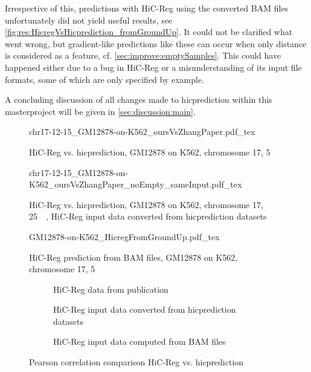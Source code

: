 Irrespective of this, predictions with HiC-Reg using the converted BAM files unfortunately did not yield useful results, see 
\autoref{fig:res:HicregVsHicprediction_fromGroundUp}.
It could not be clarified what went wrong, 
but gradient-like predictions like these can occur when only distance is
considered as a feature, cf. \autoref{sec:improve:emptySamples}.
This could have happened either due to a bug in HiC-Reg 
or a misunderstanding of its input file formats, some of which are 
only specified by example.

A concluding discussion of all changes made to hicprediction within this masterproject
will be given in \autoref{sec:discussion:main}.
\begin{figure}[hbp]
\centering
\scriptsize
{chr17-12-15_GM12878-on-K562_oursVsZhangPaper.pdf_tex}
\caption{HiC-Reg vs. hicprediction, GM12878 on K562, chromosome 17, \SI{5}{\kilo\bp}}
\label{fig:res:HicregVsHicprediction_supplementary}
\end{figure}
\begin{figure}[hbp]
\centering
\scriptsize
{chr17-12-15_GM12878-on-K562_oursVsZhangPaper_noEmpty_sameInput.pdf_tex}
\caption{HiC-Reg vs. hicprediction, GM12878 on K562, chromosome 17, \SI{25}{\kilo\bp}, HiC-Reg input data converted from hicprediction datasets}
\label{fig:res:HicregVsHicprediction_recomputed}
\end{figure}
\begin{figure}[hbp]
\centering
\scriptsize
{GM12878-on-K562_HicregFromGroundUp.pdf_tex}
\caption{HiC-Reg prediction from BAM files, GM12878 on K562, chromosome 17, \SI{5}{\kilo\bp}}
\label{fig:res:HicregVsHicprediction_fromGroundUp}
\end{figure}
\begin{figure}[hbp]
\centering
\begin{subfigure}[t]{.495\textwidth}
  \centering
 \caption{HiC-Reg data from publication \cite{Zhang2019}}
 \label{fig:res:Pearson:K562:chr17:5kb:HicregFromPublication}
\end{subfigure}\hfill%
\begin{subfigure}[t]{.495\textwidth}
  \centering
 \caption{HiC-Reg input data converted from hicprediction datasets}
 \label{fig:res:Pearson:K562:chr17:5kb:HicregFromConversion}
\end{subfigure}
\begin{subfigure}{.495\textwidth}
  \vspace{5mm}
  \centering
 \caption{HiC-Reg input data computed from BAM files}
 \label{fig:res:Pearson:K562:chr17:5kb:HicregFromBam}
\end{subfigure}
\caption{Pearson correlation comparison HiC-Reg vs. hicprediction}
\label{fig:res:Pearson:hicRegVsHicprediction}
\end{figure}
